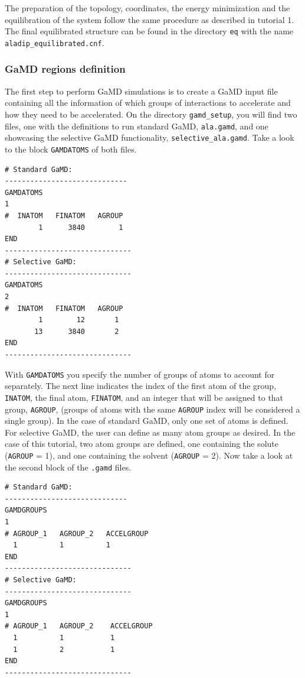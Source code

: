 The preparation of the topology, coordinates, the energy minimization and the equilibration of the system follow the same procedure as described in tutorial 1.
The final equilibrated structure can be found in the directory \texttt{eq} with the name \texttt{aladip\_equilibrated.cnf}.

\subsubsection{GaMD regions definition}
The first step to perform GaMD simulations is to create a GaMD input file containing all the information of which groups of interactions to accelerate and how they need to be accelerated. 
On the directory \texttt{gamd\_setup}, you will find two files, one with the definitions to run standard GaMD, \texttt{ala.gamd}, and one showcasing the selective GaMD functionality, \texttt{selective\_ala.gamd}. Take a look to the block \texttt{GAMDATOMS} of both files.
\begin{lstlisting}
# Standard GaMD:
-----------------------------
GAMDATOMS
1
#  INATOM   FINATOM   AGROUP      
        1      3840        1
END
------------------------------
# Selective GaMD:
------------------------------
GAMDATOMS
2
#  INATOM   FINATOM   AGROUP      
        1        12       1
       13      3840       2
END
------------------------------
\end{lstlisting}
With \texttt{GAMDATOMS} you specify the number of groups of atoms to account for separately. The next line indicates the index of the first atom of the group, \texttt{INATOM}, the final atom, \texttt{FINATOM}, and an integer that will be assigned to that group, \texttt{AGROUP}, (groups of atoms with the same \texttt{AGROUP} index will be considered a single group). In the case of standard GaMD, only one set of atoms is defined. For selective GaMD, the user can define as many atom groups as desired. In the case of this tutorial, two atom groups are defined, one containing the solute (\texttt{AGROUP} = 1), and one containing the solvent (\texttt{AGROUP} = 2).
Now take a look at the second block of the \texttt{.gamd} files.
\begin{lstlisting}
# Standard GaMD:
-----------------------------
GAMDGROUPS
1
# AGROUP_1   AGROUP_2   ACCELGROUP
  1          1          1
END
------------------------------
# Selective GaMD:
------------------------------
GAMDGROUPS
1
# AGROUP_1   AGROUP_2    ACCELGROUP
  1          1           1
  1          2           1
END
------------------------------
\end{lstlisting}
